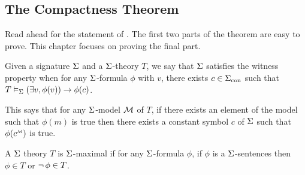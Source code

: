 \subsection{The Compactness Theorem}

Read ahead for the statement of .
The first two parts of the theorem are easy to prove.
This chapter focuses on proving the final part.

\begin{dfn}
    Given a signature $\Sigma$ and a $\Sigma$-theory $T$, 
    we say that $\Sigma$ satisfies the witness property when
    for any $\Sigma$-formula $\phi$ with 
     $v$,
    there exists $c \in {\Sigma}_\mathrm{con}$ such that 
    $T \vDash_{\Sigma} \left(\exists v, \phi(v)\right) \to \phi(c)$.
\end{dfn}
This says that for any $\Sigma$-model $\mathcal{M}$ of $T$,
if there exists an element of 
the model such that $\phi(m)$ is true
then there exists a constant symbol $c$ of $\Sigma$ 
such that $\phi(\mmintp{c})$ is true.

\begin{dfn}
    A $\Sigma$ theory $T$ is $\Sigma$-maximal if for any 
    $\Sigma$-formula $\phi$,
    if $\phi$ is a $\Sigma$-sentences then
    $\phi \in T$ or $\neg\, \phi \in T$.
\end{dfn}

